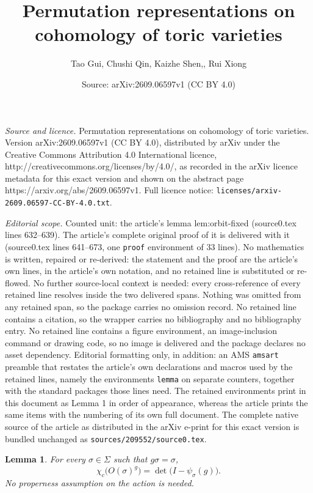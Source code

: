 \documentclass[10pt,a4paper]{amsart}
\title{Permutation representations on cohomology of toric varieties}
\author{Tao Gui, Chushi Qin, Kaizhe Shen,, Rui Xiong}
\date{Source: arXiv:2609.06597v1 (CC BY 4.0)}
\newtheorem{lemma}{Lemma}
\begin{document}
\maketitle

\noindent\emph{Source and licence.} Permutation representations on cohomology of toric varieties. Version arXiv:2609.06597v1 (CC BY 4.0), distributed by arXiv under the Creative Commons Attribution 4.0 International licence, http://creativecommons.org/licenses/by/4.0/, as recorded in the arXiv licence metadata for this exact version and shown on the abstract page https://arxiv.org/abs/2609.06597v1. Full licence notice: \texttt{licenses/arxiv-2609.06597-CC-BY-4.0.txt}.\par\smallskip

\noindent\textit{Editorial scope.} Counted unit: the article's lemma lem:orbit-fixed (source0.tex lines 632--639). The article's complete original proof of it is delivered with it (source0.tex lines 641--673, one \texttt{proof} environment of 33 lines). No mathematics is written, repaired or re-derived: the statement and the proof are the article's own lines, in the article's own notation, and no retained line is substituted or re-flowed.  No further source-local context is needed: every cross-reference of every retained line resolves inside the two delivered spans.  Nothing was omitted from any retained span, so the package carries no omission record.  No retained line contains a citation, so the wrapper carries no bibliography and no bibliography entry.  No retained line contains a figure environment, an image-inclusion command or drawing code, so no image is delivered and the package declares no asset dependency.  Editorial formatting only, in addition: an AMS \texttt{amsart} preamble that restates the article's own declarations and macros used by the retained lines, namely the environments \texttt{lemma} on separate counters, together with the standard packages those lines need.  The retained environments print in this document as Lemma 1 in order of appearance, whereas the article prints the same items with the numbering of its own full document.  The complete native source of the article as distributed in the arXiv e-print for this exact version is bundled unchanged as \texttt{sources/209552/source0.tex}.
\begin{lemma}\label{lem:orbit-fixed}
For every $\sigma\in\Sigma$ such that $g\sigma=\sigma$,
\begin{equation*}
  \chi_c\bigl(O(\sigma)^g\bigr)
  =\det\bigl(I-\psi_\sigma(g)\bigr).
\end{equation*}
No properness assumption on the action is needed.
\end{lemma}
\end{document}
